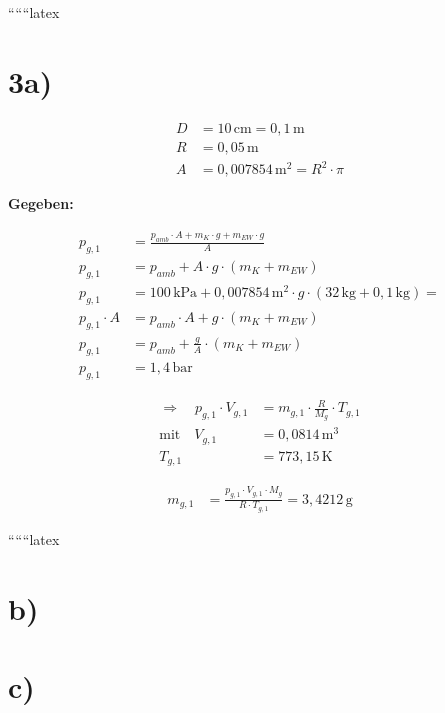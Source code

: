 
``````latex


\section*{3a)}

\begin{align*}
D &= 10 \, \text{cm} = 0{,}1 \, \text{m} \\
R &= 0{,}05 \, \text{m} \\
A &= 0{,}007854 \, \text{m}^2 = R^2 \cdot \pi
\end{align*}

\textbf{Gegeben:}

\begin{align*}
p_{g,1} &= \frac{p_{amb} \cdot A + m_K \cdot g + m_{EW} \cdot g}{A} \\
p_{g,1} &= p_{amb} + A \cdot g \cdot (m_K + m_{EW}) \\
p_{g,1} &= 100 \, \text{kPa} + 0{,}007854 \, \text{m}^2 \cdot g \cdot (32 \, \text{kg} + 0{,}1 \, \text{kg}) = \\
p_{g,1} \cdot A &= p_{amb} \cdot A + g \cdot (m_K + m_{EW}) \\
p_{g,1} &= p_{amb} + \frac{g}{A} \cdot (m_K + m_{EW}) \\
p_{g,1} &= 1{,}4 \, \text{bar}
\end{align*}

\begin{align*}
\Rightarrow \quad p_{g,1} \cdot V_{g,1} &= m_{g,1} \cdot \frac{R}{M_g} \cdot T_{g,1} \\
\text{mit} \quad V_{g,1} &= 0{,}0814 \, \text{m}^3 \\
T_{g,1} &= 773{,}15 \, \text{K}
\end{align*}

\begin{align*}
m_{g,1} &= \frac{p_{g,1} \cdot V_{g,1} \cdot M_g}{R \cdot T_{g,1}} = 3{,}4212 \, \text{g}
\end{align*}

``````latex


\section*{b)}

\section*{c)}

